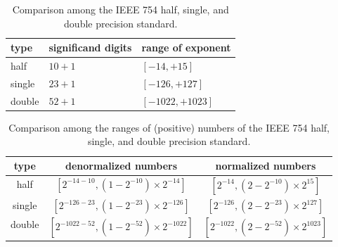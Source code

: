 \documentclass[manuscript, screen, nonacm]{acmart}
\begin{document}
\begin{table}
\caption{Comparison among the IEEE 754 half, single, and double precision standard.}
\label{table:comparing_basics}  %
\begin{tabularx}{1.0\textwidth}{
    | >{\centering\arraybackslash}X
    | >{\centering\arraybackslash}X
    | >{\centering\arraybackslash}X |
}
\hline
type & significand digits & range of exponent \\
\hline\hline
half & $10 + 1$ & $[-14, +15]$ \\
\hline
single & $23 + 1$ & $[-126, +127]$ \\
\hline
double & $52 + 1$ & $[-1022, +1023]$ \\
\hline
\end{tabularx}
\end{table}

\begin{table}
\caption{Comparison among the ranges of (positive) numbers of the IEEE 754 half, single, and double precision standard.}
\label{table:comparing_range}  %
{\tabulinesep=1.2mm
\begin{tabu}{|c|c|c|}
\hline
type & denormalized numbers & normalized numbers \\
\hline\hline
half
    & $\left[2^{-14-10}, \left(1 - 2^{-10}\right) \times 2^{-14}\right]$
    & $\left[2^{-14}, \left(2 - 2^{-10}\right) \times 2^{15}\right]$ \\
\hline
single
    & $\left[2^{-126-23}, \left(1 - 2^{-23}\right) \times 2^{-126}\right]$
    & $\left[2^{-126}, \left(2 - 2^{-23}\right) \times 2^{127}\right]$ \\
\hline
double
    & $\left[2^{-1022-52}, \left(1 - 2^{-52}\right) \times 2^{-1022}\right]$
    & $\left[2^{-1022}, \left(2 - 2^{-52}\right) \times 2^{1023}\right]$ \\
\hline
\end{tabu}
}
\end{table}
\end{document}
